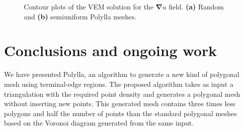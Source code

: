 \documentclass[lineno,pdflatex,sn-mathphys]{sn-jnl}%
\theoremstyle{thmstyleone}%
\theoremstyle{thmstyletwo}%
\theoremstyle{thmstylethree}%
\begin{document}
\begin{figure}[!bth]
\centering     %
{} \hspace{0.5cm}
\caption{Contour plots of the VEM solution for the $\bm{\nabla}u$ field. \textbf{(a)} Random and \textbf{(b)} semiuniform Polylla meshes.}
\label{figs:ContourPlotsGrad} 
\end{figure}


%
%
\clearpage

\section{Conclusions and ongoing work}
\label{sec:conclusions}

We have presented Polylla, an algorithm to generate a new kind of polygonal mesh using terminal-edge regions. The proposed algorithm takes as input a triangulation with the required point density and generates a polygonal mesh without inserting new points. This generated mesh contains three times less polygons and half the number of points than the standard polygonal meshes based on the Voronoi diagram generated from the same input.
\end{document}

